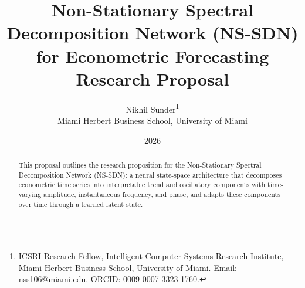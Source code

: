 \documentclass[11pt,letterpaper]{article}
\title{Non-Stationary Spectral Decomposition Network (NS-SDN) for Econometric Forecasting\\[0.4em]\large Research Proposal}
\author{Nikhil Sunder\thanks{ICSRI Research Fellow, Intelligent Computer Systems Research Institute, Miami Herbert Business School, University of Miami. Email: \href{mailto:nss106@miami.edu}{nss106@miami.edu}. ORCID: \href{https://orcid.org/0009-0007-3323-1760}{0009-0007-3323-1760}.}\\
\normalsize Miami Herbert Business School, University of Miami}
\date{2026}
\begin{document}
\maketitle

\begin{abstract}
\noindent This proposal outlines the research proposition for the Non-Stationary Spectral Decomposition Network (NS-SDN): a neural state-space architecture that decomposes econometric time series into interpretable trend and oscillatory components with time-varying amplitude, instantaneous frequency, and phase, and adapts these components over time through a learned latent state.
\end{abstract}

















\end{document}
